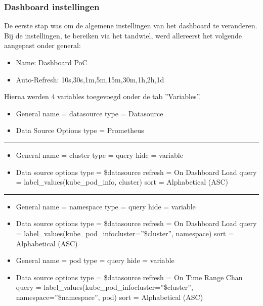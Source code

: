 \subsubsection{Dashboard instellingen}

De eerste stap was om de algemene instellingen van het dashboard te veranderen. Bij de instellingen, te bereiken via het tandwiel, werd allereerst het volgende aangepast onder general:

\begin{itemize}
    \item Name: Dashboard PoC
    \item Auto-Refresh: 10s,30s,1m,5m,15m,30m,1h,2h,1d
\end{itemize}   

Hierna werden 4 variables toegevoegd onder de tab ''Variables''.\\

\begin{itemize}
    \item General
    \subitem name = datasource
    \subitem type = Datasource
    \item Data Source Options
    \subitem type = Prometheus\\
\end{itemize}
\hrule
\begin{itemize}
    \item General
    \subitem name = cluster
    \subitem type = query
    \subitem hide = variable
    \item Data source options
    \subitem type  = \$datasource
    \subitem refresh = On Dashboard Load
    \subitem query = label\_values(kube\_pod\_info, cluster)
    \subitem sort = Alphabetical (ASC)\\
\end{itemize}
\hrule
\begin{itemize}
    \item General
    \subitem name = namespace
    \subitem type = query
    \subitem hide = variable
    \item Data source options
    \subitem type  = \$datasource
    \subitem refresh = On Dashboard Load
    \subitem query = label\_values(kube\_pod\_info{cluster=''\$cluster''}, namespace)
    \subitem sort = Alphabetical (ASC)\\
\end{itemize} 
\begin{itemize}
    \item General
    \subitem name = pod
    \subitem type = query
    \subitem hide = variable
    \item Data source options
    \subitem type  = \$datasource
    \subitem refresh = On Time Range Chan
    \subitem query = label\_values(kube\_pod\_info{cluster=''\$cluster'', namespace=''\$namespace''}, pod)
    \subitem sort = Alphabetical (ASC)
\end{itemize}

